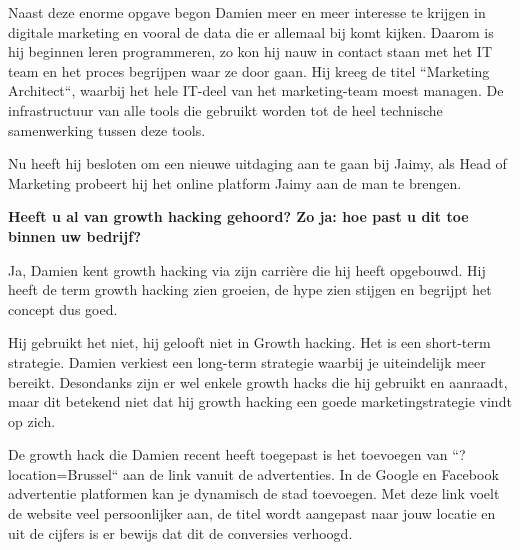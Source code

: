 Naast deze enorme opgave begon Damien meer en meer interesse te krijgen in digitale marketing en vooral de data die er allemaal bij komt kijken. Daarom is hij beginnen leren programmeren, zo kon hij nauw in contact staan met het IT team en het proces begrijpen waar ze door gaan. Hij kreeg de titel ``Marketing Architect``, waarbij het hele IT-deel van het marketing-team moest managen. De infrastructuur van alle tools die gebruikt worden tot de heel technische samenwerking tussen deze tools.

Nu heeft hij besloten om een nieuwe uitdaging aan te gaan bij Jaimy, als Head of Marketing probeert hij het online platform Jaimy aan de man te brengen.

\textbf{Heeft u al van growth hacking gehoord? Zo ja: hoe past u dit toe binnen uw bedrijf?}
	
Ja, Damien kent growth hacking via zijn carrière die hij heeft opgebouwd. Hij heeft de term growth hacking zien groeien, de hype zien stijgen en begrijpt het concept dus goed.

Hij gebruikt het niet, hij gelooft niet in Growth hacking. Het is een short-term strategie. Damien verkiest een long-term strategie waarbij je uiteindelijk meer bereikt. Desondanks zijn er wel enkele growth hacks die hij gebruikt en aanraadt, maar dit betekend niet dat hij growth hacking een goede marketingstrategie vindt op zich. 

De growth hack die Damien recent heeft toegepast is het toevoegen van ``?location=Brussel`` aan de link vanuit de advertenties. In de Google en Facebook advertentie platformen kan je dynamisch de stad toevoegen. Met deze link voelt de website veel persoonlijker aan, de titel wordt aangepast naar jouw locatie en uit de cijfers is er bewijs dat dit de conversies verhoogd.

